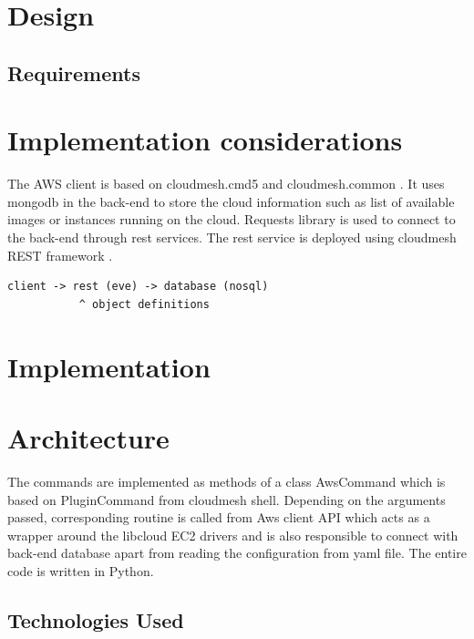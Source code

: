 \documentclass[9pt,twocolumn,twoside]{../../styles/osajnl}
\begin{document}
\section{Design}

\subsection{Requirements}


\section{Implementation considerations}

The AWS client is based on cloudmesh.cmd5 \cite{www-cloudmesh-cmd5}
and cloudmesh.common \cite{www-cloudmesh-common}. It uses mongodb in
the back-end to store the cloud information such as list of available
images or instances running on the cloud. Requests library
\cite{www-python-requests} is used to connect to the back-end through
rest services. The rest service is deployed using cloudmesh REST
framework \cite{www-cloudmesh-rest}.

\begin{verbatim}
client -> rest (eve) -> database (nosql)
           ^ object definitions
\end{verbatim}

\section{Implementation}



\section{Architecture}

The commands are implemented as methods of a class AwsCommand which is
based on PluginCommand from cloudmesh shell. Depending on the
arguments passed, corresponding routine is called from Aws client API
which acts as a wrapper around the libcloud EC2 drivers
\cite{www-libcloud-ec2} and is also responsible to connect with
back-end database apart from reading the configuration from yaml
file. The entire code is written in Python.

\subsection{Technologies Used}
\end{document}
